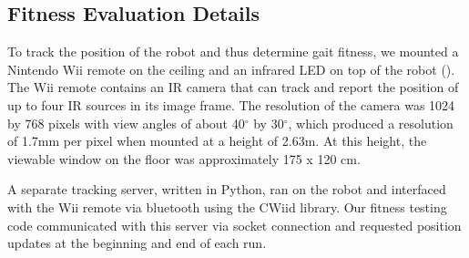 \subsection{Fitness Evaluation Details}

%
%
%
%
%
%



To track the position of the robot and thus determine gait fitness, we
mounted a Nintendo Wii remote on the ceiling and an infrared LED on
top of the robot ().  The Wii remote contains
an IR camera that can track and report the position of up to four IR
sources in its image frame.  The resolution of the camera was 1024 by
768 pixels with view angles of about 40$^\circ$ by 30$^\circ$, which
produced a resolution of 1.7mm per pixel when mounted at a height of
2.63m.  At this height, the viewable window on the floor was
approximately 175 x 120 cm.

A separate tracking server, written in Python, ran on the robot and
interfaced with the Wii remote via bluetooth using the CWiid
library\cite{cwiid}.  Our fitness testing code communicated with this
server via socket connection and requested position updates at the
beginning and end of each run.



